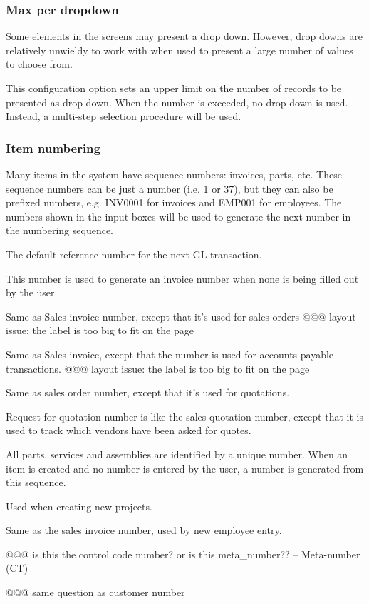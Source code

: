 \subsubsection{Max per dropdown}
\label{subsubsec-company-config-defaults-max-dropdown}

Some elements in the screens may present a drop down. However, drop downs are
relatively unwieldy to work with when used to present a large number of values
to choose from.

This configuration option sets an upper limit on the number of records to be
presented as drop down.  When the number is exceeded, no drop down is used.  Instead,
a multi-step selection procedure will be used.

\subsubsection{Item numbering}
\label{subsubsec-company-config-defaults-item-numbers}

Many items in the system have sequence numbers: invoices, parts, etc.
 These sequence numbers can be just a number (i.e. 1 or 37),
but they can also be prefixed numbers, e.g. INV0001 for invoices and EMP001 for employees.
The numbers shown in the input boxes will be used to generate the next number in the
numbering sequence.

\begin{description}[style=nextline]
\item [GL Reference number] The default reference number for the next GL transaction.
\item [Sales invoice/ AR Transaction number] This number is used to generate an invoice
number when none is being filled out by the user.
\item [Sales order number ] Same as Sales invoice number, except that it's used for sales orders @@@ layout issue: the label is too big to fit on the page
\item [Vendor invoice/ AP Transaction number] Same as Sales invoice, except that the number
is used for accounts payable transactions. @@@ layout issue: the label is too big to fit on the page 
\item [Sales quotation number] Same as sales order number, except that it's used for quotations.
\item [RFQ number] Request for quotation number is like the sales quotation number, except
that it is used to track which vendors have been asked for quotes.
\item [Part number] All parts, services and assemblies are identified by a unique number.
When an item is created and no number is entered by the user, a number is generated
from this sequence.
\item [Job/project number] Used when creating new projects.
\item [Employee number ] Same as the sales invoice number, used by new employee entry.
\item [Customer number] @@@ is this the control code number? or is this
meta\_number?? -- Meta-number (CT) 
\item [Vendor number] @@@ same question as customer number
\end{description}

